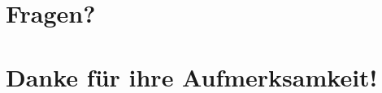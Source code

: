 \documentclass[11pt]{beamer}
\begin{document}
\section*{Fragen?}
\section*{Danke für ihre Aufmerksamkeit!}



















\end{document}
